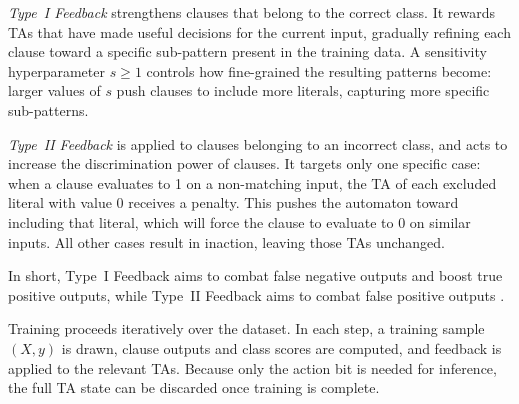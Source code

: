 \textit{Type~I Feedback} strengthens clauses that belong to the correct class. It rewards TAs that have made useful decisions for the current input, gradually refining each clause toward a specific sub-pattern present in the training data. A sensitivity hyperparameter $s \geq 1$ controls how fine-grained the resulting patterns become: larger values of $s$ push clauses to include more literals, capturing more specific sub-patterns.

\textit{Type~II Feedback} is applied to clauses belonging to an incorrect class, and acts to increase the discrimination power of clauses. It targets only one specific case: when a clause evaluates to 1 on a non-matching input, the TA of each excluded literal with value 0 receives a penalty. This pushes the automaton toward including that literal, which will force the clause to evaluate to 0 on similar inputs. All other cases result in inaction, leaving those TAs unchanged.

In short, Type~I Feedback aims to combat false negative outputs and boost true positive outputs, while Type~II Feedback aims to combat false positive outputs \cite{GranmoOle-Christoffer2018TTM-}.

Training proceeds iteratively over the dataset. In each step, a training sample $(X, y)$ is drawn, clause outputs and class scores are computed, and feedback is applied to the relevant TAs. Because only the action bit is needed for inference, the full TA state can be discarded once training is complete.
